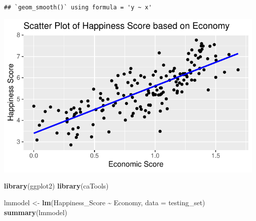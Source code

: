 \documentclass[
  11pt,
]{article}
\newenvironment{Shaded}{\begin{snugshade}}{\end{snugshade}}
\newcommand{\AttributeTok}[1]{\textcolor[rgb]{0.13,0.29,0.53}{#1}}
\newcommand{\ConstantTok}[1]{\textcolor[rgb]{0.56,0.35,0.01}{#1}}
\newcommand{\DecValTok}[1]{\textcolor[rgb]{0.00,0.00,0.81}{#1}}
\newcommand{\FloatTok}[1]{\textcolor[rgb]{0.00,0.00,0.81}{#1}}
\newcommand{\FunctionTok}[1]{\textcolor[rgb]{0.13,0.29,0.53}{\textbf{#1}}}
\newcommand{\NormalTok}[1]{#1}
\newcommand{\OtherTok}[1]{\textcolor[rgb]{0.56,0.35,0.01}{#1}}
\newcommand{\SpecialCharTok}[1]{\textcolor[rgb]{0.81,0.36,0.00}{\textbf{#1}}}
\begin{document}
\begin{verbatim}
## `geom_smooth()` using formula = 'y ~ x'
\end{verbatim}

\begin{center}\includegraphics[width=0.7\linewidth]{Group_project_2_files/figure-latex/unnamed-chunk-41-1} \end{center}

\begin{Shaded}
\begin{Highlighting}[]
\FunctionTok{library}\NormalTok{(ggplot2)}
\FunctionTok{library}\NormalTok{(caTools)}
\end{Highlighting}
\end{Shaded}

\begin{Shaded}
\end{Shaded}

\begin{Shaded}
\begin{Highlighting}[]
\NormalTok{lmmodel }\OtherTok{\textless{}{-}} \FunctionTok{lm}\NormalTok{(Happiness\_Score }\SpecialCharTok{\textasciitilde{}}\NormalTok{ Economy, }\AttributeTok{data =}\NormalTok{ testing\_set)}
\FunctionTok{summary}\NormalTok{(lmmodel)}
\end{Highlighting}
\end{Shaded}
\end{document}
